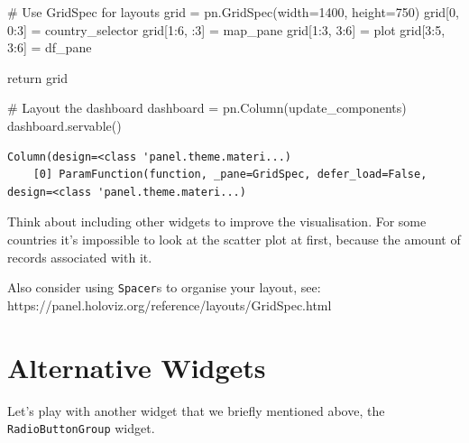 \documentclass[
  letterpaper,
  DIV=11,
  numbers=noendperiod]{scrreprt}
\newenvironment{Shaded}{\begin{snugshade}}{\end{snugshade}}
\newcommand{\CommentTok}[1]{\textcolor[rgb]{0.37,0.37,0.37}{#1}}
\newcommand{\ControlFlowTok}[1]{\textcolor[rgb]{0.00,0.23,0.31}{#1}}
\newcommand{\DecValTok}[1]{\textcolor[rgb]{0.68,0.00,0.00}{#1}}
\newcommand{\NormalTok}[1]{\textcolor[rgb]{0.00,0.23,0.31}{#1}}
\newcommand{\OperatorTok}[1]{\textcolor[rgb]{0.37,0.37,0.37}{#1}}
\begin{document}
\begin{Shaded}
\begin{Highlighting}[]
    \CommentTok{\# Use GridSpec for layouts}
\NormalTok{    grid }\OperatorTok{=}\NormalTok{ pn.GridSpec(width}\OperatorTok{=}\DecValTok{1400}\NormalTok{, height}\OperatorTok{=}\DecValTok{750}\NormalTok{)}
\NormalTok{    grid[}\DecValTok{0}\NormalTok{, }\DecValTok{0}\NormalTok{:}\DecValTok{3}\NormalTok{] }\OperatorTok{=}\NormalTok{ country\_selector}
\NormalTok{    grid[}\DecValTok{1}\NormalTok{:}\DecValTok{6}\NormalTok{, :}\DecValTok{3}\NormalTok{] }\OperatorTok{=}\NormalTok{ map\_pane}
\NormalTok{    grid[}\DecValTok{1}\NormalTok{:}\DecValTok{3}\NormalTok{, }\DecValTok{3}\NormalTok{:}\DecValTok{6}\NormalTok{] }\OperatorTok{=}\NormalTok{ plot}
\NormalTok{    grid[}\DecValTok{3}\NormalTok{:}\DecValTok{5}\NormalTok{, }\DecValTok{3}\NormalTok{:}\DecValTok{6}\NormalTok{] }\OperatorTok{=}\NormalTok{ df\_pane}
    
    \ControlFlowTok{return}\NormalTok{ grid}

\CommentTok{\# Layout the dashboard}
\NormalTok{dashboard }\OperatorTok{=}\NormalTok{ pn.Column(update\_components)}
\NormalTok{dashboard.servable()}
\end{Highlighting}
\end{Shaded}

\begin{verbatim}
Column(design=<class 'panel.theme.materi...)
    [0] ParamFunction(function, _pane=GridSpec, defer_load=False, design=<class 'panel.theme.materi...)
\end{verbatim}

Think about including other widgets to improve the visualisation. For
some countries it's impossible to look at the scatter plot at first,
because the amount of records associated with it.

Also consider using \texttt{Spacer}s to organise your layout, see:
https://panel.holoviz.org/reference/layouts/GridSpec.html

\hypertarget{alternative-widgets}{%
\section{Alternative Widgets}\label{alternative-widgets}}

Let's play with another widget that we briefly mentioned above, the
\texttt{RadioButtonGroup} widget.
\end{document}
